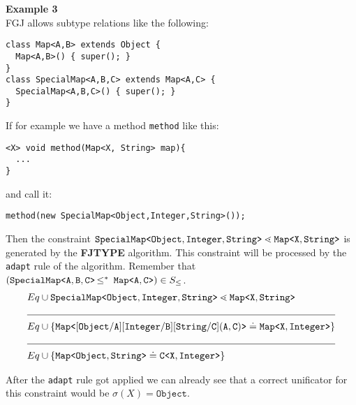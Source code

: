 \documentclass[a4paper,USenglish,cleveref, autoref, thm-restate]{lipics-v2021}
\begin{document}
\textbf{Example 3}\\
FGJ allows subtype relations like the following:
\begin{lstlisting}
class Map<A,B> extends Object {
  Map<A,B>() { super(); }
}
class SpecialMap<A,B,C> extends Map<A,C> {
  SpecialMap<A,B,C>() { super(); }
}
\end{lstlisting}

If for example we have a method \texttt{method} like this:
\begin{lstlisting}
<X> void method(Map<X, String> map){
  ...
}
\end{lstlisting}
and call it:
\begin{lstlisting}
method(new SpecialMap<Object,Integer,String>());
\end{lstlisting}

Then the constraint $\mathtt{SpecialMap \texttt{<} Object,Integer,String \texttt{>} } \lessdot \mathtt{Map \texttt{<} X,String \texttt{>} }$
is generated by the \textbf{FJTYPE} algorithm.
This constraint will be processed by the \texttt{adapt} rule of the \unify{} algorithm.
Remember that $(\mathtt{SpecialMap \texttt{<} A,B,C \texttt{>} } \textrm{$\, \leq^\ast \,$}\  \mathtt{Map \texttt{<} A,C \texttt{>} }) \in S_\leq$.
\begin{align*}
  Eq& \cup \exptype{SpecialMap}{Object,Integer,String} \lessdot \exptype{Map}{X,String} \\
  \cline{1-2} 
  Eq& \cup \set{\exptype{Map}{[ Object / A ][ Integer / B ][ String / C ](A,C)}
  \doteq \exptype{Map}{X,Integer}} \\
  \cline{1-2} 
  Eq& \cup \set{\exptype{Map}{Object,String}
  \doteq \exptype{C}{X, Integer}}
\end{align*}

After the \texttt{adapt} rule got applied we can already see that a correct unificator for this constraint would be
$\sigma(X) = \texttt{Object}$.
\end{document}
